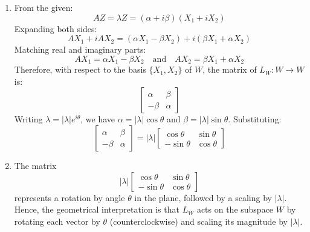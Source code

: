 \documentclass[12pt]{article}
\begin{document}
\begin{enumerate}
\begin{enumerate}
    \item 
    From the given:
    \[
    A Z = \lambda Z = (\alpha + i \beta)(X_1 + i X_2)
    \]
    Expanding both sides:
    \[
    A X_1 + i A X_2 = (\alpha X_1 - \beta X_2) + i (\beta X_1 + \alpha X_2)
    \]
    Matching real and imaginary parts:
    \[
    A X_1 = \alpha X_1 - \beta X_2 \quad \text{and} \quad A X_2 = \beta X_1 + \alpha X_2
    \]
    Therefore, with respect to the basis $\{X_1, X_2\}$ of $W$, the matrix of $L_W : W \to W$ is:
    \[
    \begin{bmatrix}
    \alpha & \beta \\
    -\beta & \alpha
    \end{bmatrix}
    \]
    Writing $\lambda = |\lambda| e^{i\theta}$, we have $\alpha = |\lambda| \cos\theta$ and $\beta = |\lambda| \sin\theta$. Substituting:
    \[
    \begin{bmatrix}
    \alpha & \beta \\
    -\beta & \alpha
    \end{bmatrix}
    =
    |\lambda|
    \begin{bmatrix}
    \cos\theta & \sin\theta \\
    -\sin\theta & \cos\theta
    \end{bmatrix}
    \]

    \item 
    The matrix
    \[
    |\lambda|
    \begin{bmatrix}
    \cos\theta & \sin\theta \\
    -\sin\theta & \cos\theta
    \end{bmatrix}
    \]
    represents a rotation by angle $\theta$ in the plane, followed by a scaling by $|\lambda|$. Hence, the geometrical interpretation is that $L_W$ acts on the subspace $W$ by rotating each vector by $\theta$ (counterclockwise) and scaling its magnitude by $|\lambda|$.
\end{enumerate}

\end{enumerate}
\end{document}
